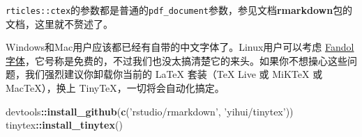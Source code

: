 \documentclass[hyperref,]{ctexart}
\newenvironment{Shaded}{\begin{snugshade}}{\end{snugshade}}
\newcommand{\KeywordTok}[1]{\textcolor[rgb]{0.13,0.29,0.53}{\textbf{#1}}}
\newcommand{\NormalTok}[1]{#1}
\newcommand{\OperatorTok}[1]{\textcolor[rgb]{0.81,0.36,0.00}{\textbf{#1}}}
\newcommand{\StringTok}[1]{\textcolor[rgb]{0.31,0.60,0.02}{#1}}
\begin{document}
\texttt{rticles::ctex}的参数都是普通的\texttt{pdf\_document}参数，参见文档\textbf{rmarkdown}包的文档，这里就不赘述了。

Windows和Mac用户应该都已经有自带的中文字体了。Linux用户可以考虑
\href{http://ctan.org/pkg/fandol}{Fandol字体}，它号称是免费的，不过我们也没太搞清楚它的来头。如果你不想操心这些问题，我们强烈建议你卸载你当前的
LaTeX 套装（TeX Live 或 MiKTeX 或 MacTeX），换上
TinyTeX，一切将会自动化搞定。

\begin{Shaded}
\begin{Highlighting}[]
\NormalTok{devtools}\OperatorTok{::}\KeywordTok{install_github}\NormalTok{(}\KeywordTok{c}\NormalTok{(}\StringTok{'rstudio/rmarkdown'}\NormalTok{, }\StringTok{'yihui/tinytex'}\NormalTok{))}
\NormalTok{tinytex}\OperatorTok{::}\KeywordTok{install_tinytex}\NormalTok{()}
\end{Highlighting}
\end{Shaded}
\end{document}
